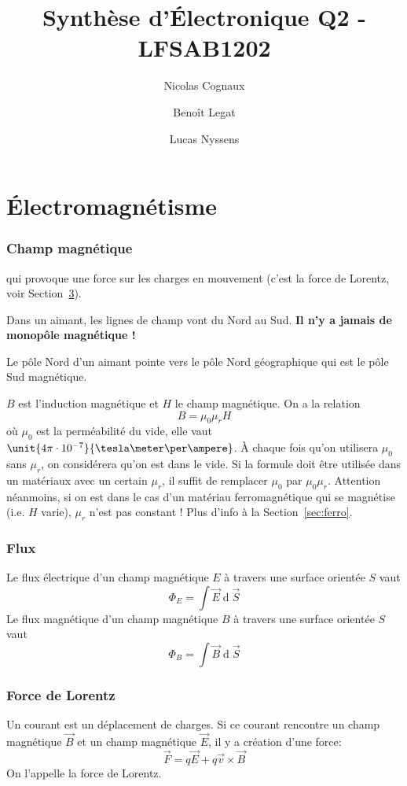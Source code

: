 \documentclass[11pt,a4paper]{article}
\title{Synthèse d'Électronique Q2 - LFSAB1202}
\author{Nicolas Cognaux \and Benoît Legat \and Lucas Nyssens}
\newcommand{\B}{\vec B}
\newcommand{\E}{\vec E}
\DeclareMathOperator{\diff}{d}
\newcommand{\dif}{\diff\!}
\begin{document}
\maketitle

\part{Électromagnétisme}

\section{Champ magnétique}
qui provoque une force sur les charges en mouvement (c'est la force de Lorentz, voir Section~\ref{sec:lorentz}).

Dans un aimant, les lignes de champ vont du Nord au Sud.
{\bf Il n'y a jamais de monopôle magnétique !}

Le pôle Nord d'un aimant pointe vers le pôle Nord géographique qui est le pôle Sud magnétique.

$B$ est l'induction magnétique et $H$ le champ magnétique.
On a la relation
\[ B = \mu_0\mu_rH \]
où $\mu_0$ est la perméabilité du vide, elle vaut $\unit{4\pi \cdot 10^{-7}}{\tesla\meter\per\ampere}$.
À chaque fois qu'on utilisera $\mu_0$ sans $\mu_r$, on considérera qu'on est dans le vide.
Si la formule doit être utilisée dans un matériaux avec un certain $\mu_r$,
il suffit de remplacer $\mu_0$ par $\mu_0\mu_r$.
Attention néanmoins, si on est dans le cas d'un matériau ferromagnétique qui se magnétise (i.e. $H$ varie), $\mu_r$ n'est pas constant !
Plus d'info à la Section~\ref{sec:ferro}.

\section{Flux}
Le flux électrique d'un champ magnétique $E$ à travers une surface orientée $S$ vaut
\[ \Phi_E = \int \E \dif \vec S \]
Le flux magnétique d'un champ magnétique $B$ à travers une surface orientée $S$ vaut
\[ \Phi_B = \int \B \dif \vec S \]

\section{Force de Lorentz}
\label{sec:lorentz}
Un courant est un déplacement de charges.
Si ce courant rencontre un champ magnétique $\B$ et un champ magnétique $\E$, il y a création d'une force:
$$ \vec F = q \E + q \vec v \times \B $$
On l'appelle la force de Lorentz.
\end{document}
